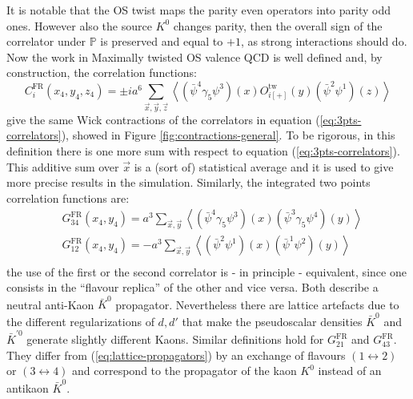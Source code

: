 \documentclass[english, LaM, oneside, noexaminfo]{sapthesis}
\newcommand{\la}{\langle}
\newcommand{\ra}{\rangle}
\begin{document}
It is notable that the OS twist maps the parity even operators into parity odd ones.
However also the source $K^{0}$ changes parity, then the overall sign of the correlator under $\mathbb{P}$ is preserved and equal to $+1$, as strong interactions should do.
Now the work in Maximally twisted OS valence QCD is well defined and, by construction, the correlation functions:
\begin{equation}\label{eq:lattice-correlators}
    C_i^\text{FR}(x_4,y_4,z_4) = \pm i a^6 \sum_{\vec x, \vec y, \vec z}\left\la \left(\bar\psi^4 \gamma_5 \psi^3 \right) (x) O_{i[+]}^\text{tw} (y) \left(\bar\psi^2 \psi^1 \right) (z)\right\ra
\end{equation}
give the same Wick contractions of the correlators in equation (\ref{eq:3pts-correlators}), showed in Figure \ref{fig:contractions-general}.
To be rigorous, in this definition there is one more sum with respect to equation (\ref{eq:3pts-correlators}).
This additive sum over $\vec x$ is a (sort of) statistical average and it is used to give more precise results in the simulation.
Similarly, the integrated two points correlation functions are:
\begin{equation}\label{eq:lattice-propagators}
    \begin{split}
        & G_{34}^\text{FR}(x_4,y_4) = a^3 \sum_{\vec x, \vec y} \left\la \left(\bar\psi^4 \gamma_5 \psi^3 \right) (x) \left(\bar\psi^3 \gamma_5 \psi^4 \right) (y) \right\ra \\
        & G_{12}^\text{FR}(x_4,y_4) = - a^3 \sum_{\vec x, \vec y} \left\la \left(\bar\psi^2 \psi^1 \right) (x) \left(\bar\psi^1 \psi^2 \right) (y) \right\ra \\
    \end{split}
\end{equation}
the use of the first or the second correlator is - in principle - equivalent, since one consists in the ``flavour replica'' of the other and vice versa.
Both describe a neutral anti-Kaon $\bar K^0$ propagator.
Nevertheless there are lattice artefacts due to the different regularizations of $d,d'$ that make the pseudoscalar densities $\bar K^0$ and $\bar K^{'0}$ generate slightly different Kaons.
\newline 
Similar definitions hold for $G_{21}^\text{FR}$ and $G_{43}^\text{FR}$.
They differ from (\ref{eq:lattice-propagators}) by an exchange of flavours $(1\leftrightarrow 2)$ or $(3\leftrightarrow 4)$ and correspond to the propagator of the kaon $K^0$ instead of an antikaon $\bar K^0$.
\newline
\end{document}
